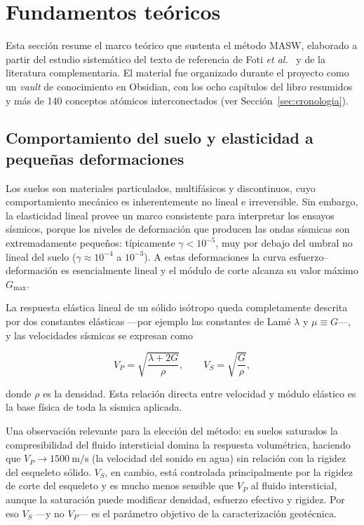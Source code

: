 \section{Fundamentos te\'oricos}
\label{sec:fundamentos}

Esta secci\'on resume el marco te\'orico que sustenta el m\'etodo MASW, elaborado a partir
del estudio sistem\'atico del texto de referencia de Foti \emph{et al.}~\cite{Foti2014}
y de la literatura complementaria. El material fue organizado durante el proyecto como
un \emph{vault} de conocimiento en Obsidian, con los ocho cap\'itulos del libro resumidos
y m\'as de 140 conceptos at\'omicos interconectados (ver Secci\'on~\ref{sec:cronologia}).

\subsection{Comportamiento del suelo y elasticidad a peque\~nas deformaciones}

Los suelos son materiales particulados, multif\'asicos y discontinuos, cuyo comportamiento
mec\'anico es inherentemente no lineal e irreversible. Sin embargo, la elasticidad lineal
provee un marco consistente para interpretar los ensayos s\'ismicos, porque los niveles
de deformaci\'on que producen las ondas s\'ismicas son extremadamente peque\~nos: t\'ipicamente
$\gamma<10^{-5}$, muy por debajo del umbral no lineal del suelo ($\gamma\approx10^{-4}$
a $10^{-3}$). A estas deformaciones la curva esfuerzo--deformaci\'on es esencialmente
lineal y el m\'odulo de corte alcanza su valor m\'aximo $G_{\max}$.

La respuesta el\'astica lineal de un s\'olido is\'otropo queda completamente descrita por
dos constantes el\'asticas ---por ejemplo las constantes de Lam\'e $\lambda$ y
$\mu\equiv G$---, y las velocidades s\'ismicas se expresan como

\begin{equation}
V_P=\sqrt{\frac{\lambda+2G}{\rho}},\qquad V_S=\sqrt{\frac{G}{\rho}},
\label{eq:velocidades}
\end{equation}

donde $\rho$ es la densidad. Esta relaci\'on directa entre velocidad y m\'odulo el\'astico
es la base f\'isica de toda la s\'ismica aplicada.

Una observaci\'on relevante para la elecci\'on del m\'etodo: en suelos saturados la
compresibilidad del fluido intersticial domina la respuesta volum\'etrica, haciendo que
$V_P\to\SI{1500}{\meter\per\second}$ (la velocidad del sonido en agua) sin relaci\'on con
la rigidez del esqueleto s\'olido. $V_S$, en cambio, est\'a controlada principalmente por
la rigidez de corte del esqueleto y es mucho menos sensible que $V_P$ al fluido
intersticial, aunque la saturaci\'on puede modificar densidad, esfuerzo efectivo y rigidez.
Por eso $V_S$ ---y no
$V_P$--- es el par\'ametro objetivo de la caracterizaci\'on geot\'ecnica.

